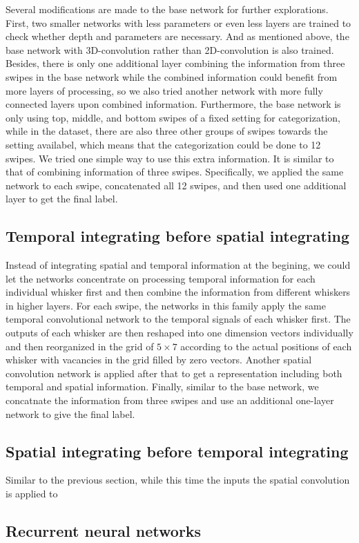 Several modifications are made to the base network for further explorations. First, two smaller networks with less parameters or even less layers are trained to check whether depth and parameters are necessary.
And as mentioned above, the base network with 3D-convolution rather than 2D-convolution is also trained.
Besides, there is only one additional layer combining the information from three swipes in the base network while the combined information could benefit from more layers of processing, so we also tried another network with more fully connected layers upon combined information.
Furthermore, the base network is only using top, middle, and bottom swipes of a fixed setting for categorization, while in the dataset, there are also three other groups of swipes towards the setting availabel, which means that the categorization could be done to 12 swipes. 
We tried one simple way to use this extra information. It is similar to that of combining information of three swipes. Specifically, we applied the same network to each swipe, concatenated all 12 swipes, and then used one additional layer to get the final label.

\subsection{Temporal integrating before spatial integrating}

Instead of integrating spatial and temporal information at the begining, we could let the networks concentrate on processing temporal information for each individual whisker first and then combine the information from different whiskers in higher layers.
For each swipe, the networks in this family apply the same temporal convolutional network to the temporal signals of each whisker first. 
The outputs of each whisker are then reshaped into one dimension vectors individually and then reorganized in the grid of $5\times7$ according to the actual positions of each whisker with vacancies in the grid filled by zero vectors. 
Another spatial convolution network is applied after that to get a representation including both temporal and spatial information.
Finally, similar to the base network, we concatnate the information from three swipes and use an additional one-layer network to give the final label.

\subsection{Spatial integrating before temporal integrating}

Similar to the previous section, while this time the inputs the spatial convolution is applied to 

\subsection{Recurrent neural networks}
